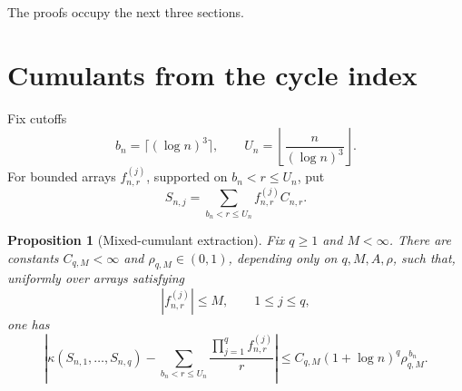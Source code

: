 \documentclass[11pt]{article}
\newtheorem{proposition}[theorem]{Proposition}
\theoremstyle{definition}
\theoremstyle{remark}
\begin{document}
The proofs occupy the next three sections.

\section{Cumulants from the cycle index}

Fix cutoffs
\[
 b_n=\lceil(\log n)^3\rceil,
 \qquad
 U_n=\left\lfloor\frac{n}{(\log n)^3}\right\rfloor.
\]
For bounded arrays $f_{n,r}^{(j)}$, supported on $b_n<r\le U_n$, put
\[
 S_{n,j}=\sum_{b_n<r\le U_n}f_{n,r}^{(j)}C_{n,r}.
\]

\begin{proposition}[Mixed-cumulant extraction]\label{prop:mixed-cumulant}
Fix $q\ge1$ and $M<\infty$.  There are constants
$C_{q,M}<\infty$ and $\rho_{q,M}\in(0,1)$, depending only on
$q,M,A,\rho$, such that, uniformly over arrays satisfying
\[
 |f_{n,r}^{(j)}|\le M,
 \qquad
 1\le j\le q,
\]
one has
\begin{equation}\label{eq:mixed-cumulant}
 \left|
 \kappa(S_{n,1},\ldots,S_{n,q})
 -
 \sum_{b_n<r\le U_n}
 \frac{\prod_{j=1}^q f_{n,r}^{(j)}}{r}
 \right|
 \le
 C_{q,M}(1+\log n)^q\rho_{q,M}^{\,b_n}.
\end{equation}
\end{proposition}
\end{document}

